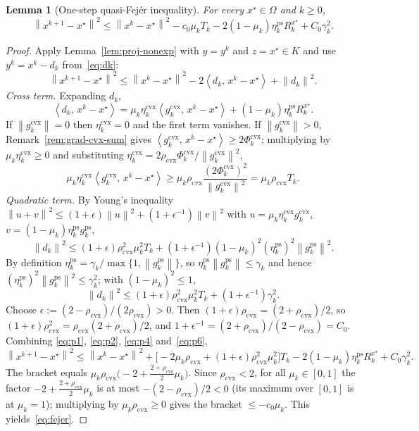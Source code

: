 \documentclass[]{interact}
\theoremstyle{plain}
\newtheorem{lemma}[theorem]{Lemma}
\theoremstyle{definition}
\theoremstyle{remark}
\newcommand{\norm}[1]{\left\lVert #1 \right\rVert}
\newcommand{\inner}[2]{\left\langle #1,\, #2 \right\rangle}
\newcommand{\cvx}{\mathrm{cvx}}
\newcommand{\ps}{\mathrm{ps}}
\begin{document}
\begin{lemma}[One-step quasi-Fej\'er inequality]\label{lem:fejer}
For every $x^\star\in\Omega$ and $k\ge 0$,
\begin{equation}\label{eq:fejer}
\norm{x^{k+1}-x^\star}^2\le\norm{x^k-x^\star}^2-c_0\mu_k T_k-2(1-\mu_k)\eta^{\ps}_k R^{x^\star}_k+C_0\gamma_k^2 .
\end{equation}
\end{lemma}
\begin{proof}
Apply Lemma~\ref{lem:proj-nonexp} with $y=y^k$ and $z=x^\star\in K$ and use
$y^k=x^k-d_k$ from~\eqref{eq:dk}:
\begin{equation}\label{eq:p1}
\norm{x^{k+1}-x^\star}^2\le\norm{x^k-x^\star}^2-2\inner{d_k}{x^k-x^\star}+\norm{d_k}^2 .
\end{equation}
\emph{Cross term.} Expanding $d_k$,
\begin{equation}\label{eq:p2}
\inner{d_k}{x^k-x^\star}=\mu_k\eta^{\cvx}_k\inner{g^{\cvx}_k}{x^k-x^\star}+(1-\mu_k)\eta^{\ps}_k R^{x^\star}_k .
\end{equation}
If $\norm{g^{\cvx}_k}=0$ then $\eta^{\cvx}_k=0$ and the first term vanishes. If
$\norm{g^{\cvx}_k}>0$, Remark~\ref{rem:grad-cvx-sum} gives
$\inner{g^{\cvx}_k}{x^k-x^\star}\ge 2\Phi^{\cvx}_k$; multiplying by
$\mu_k\eta^{\cvx}_k\ge 0$ and substituting
$\eta^{\cvx}_k=2\rho_{\cvx}\Phi^{\cvx}_k/\norm{g^{\cvx}_k}^2$,
\begin{equation}\label{eq:p4}
\mu_k\eta^{\cvx}_k\inner{g^{\cvx}_k}{x^k-x^\star}\ge\mu_k\rho_{\cvx}\frac{(2\Phi^{\cvx}_k)^2}{\norm{g^{\cvx}_k}^2}=\mu_k\rho_{\cvx}T_k .
\end{equation}
\emph{Quadratic term.} By Young's inequality
$\norm{u+v}^2\le(1+\epsilon)\norm{u}^2+(1+\epsilon^{-1})\norm{v}^2$ with
$u=\mu_k\eta^{\cvx}_k g^{\cvx}_k$, $v=(1-\mu_k)\eta^{\ps}_k g^{\ps}_k$,
\[
\norm{d_k}^2\le(1+\epsilon)\rho_{\cvx}^2\mu_k^2 T_k+(1+\epsilon^{-1})(1-\mu_k)^2(\eta^{\ps}_k)^2\norm{g^{\ps}_k}^2 .
\]
By definition $\eta^{\ps}_k=\gamma_k/\max\{1,\norm{g^{\ps}_k}\}$, so
$\eta^{\ps}_k\norm{g^{\ps}_k}\le\gamma_k$ and hence
$(\eta^{\ps}_k)^2\norm{g^{\ps}_k}^2\le\gamma_k^2$; with $(1-\mu_k)^2\le 1$,
\begin{equation}\label{eq:p6}
\norm{d_k}^2\le(1+\epsilon)\rho_{\cvx}^2\mu_k^2 T_k+(1+\epsilon^{-1})\gamma_k^2 .
\end{equation}
Choose $\epsilon:=(2-\rho_{\cvx})/(2\rho_{\cvx})>0$. Then
$(1+\epsilon)\rho_{\cvx}=(2+\rho_{\cvx})/2$, so
$(1+\epsilon)\rho_{\cvx}^2=\rho_{\cvx}(2+\rho_{\cvx})/2$, and
$1+\epsilon^{-1}=(2+\rho_{\cvx})/(2-\rho_{\cvx})=C_0$. Combining
\eqref{eq:p1}, \eqref{eq:p2}, \eqref{eq:p4} and~\eqref{eq:p6},
\[
\norm{x^{k+1}-x^\star}^2\le\norm{x^k-x^\star}^2+\bigl[-2\mu_k\rho_{\cvx}+(1+\epsilon)\rho_{\cvx}^2\mu_k^2\bigr]T_k-2(1-\mu_k)\eta^{\ps}_k R^{x^\star}_k+C_0\gamma_k^2 .
\]
The bracket equals
$\mu_k\rho_{\cvx}\bigl(-2+\tfrac{2+\rho_{\cvx}}{2}\mu_k\bigr)$. Since $\rho_{\cvx}<2$, for
all $\mu_k\in[0,1]$ the factor $-2+\tfrac{2+\rho_{\cvx}}{2}\mu_k$ is at most
$-(2-\rho_{\cvx})/2<0$ (its maximum over $[0,1]$ is at $\mu_k=1$); multiplying by
$\mu_k\rho_{\cvx}\ge0$ gives the bracket $\le -c_0\mu_k$. This yields~\eqref{eq:fejer}.
\end{proof}
\end{document}
